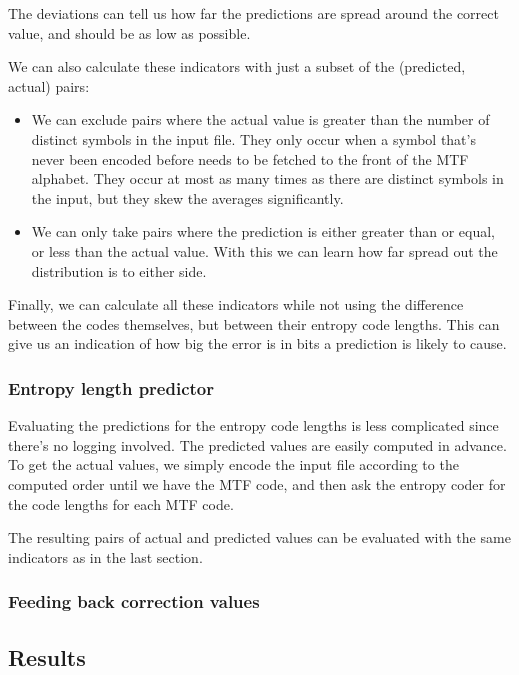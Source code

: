 \documentclass[a4paper]{scrreprt}
\begin{document}
The deviations can tell us how far the predictions are spread around the correct
value, and should be as low as possible.

We can also calculate these indicators with just a subset of the
(predicted, actual) pairs:
\begin{itemize}
  \item We can exclude pairs where the actual value is
  greater than the number of distinct symbols in the input file. They only occur
  when a symbol that's never been encoded before needs to be fetched to the
  front of the MTF alphabet. They occur at most as many times as there are
  distinct symbols in the input, but they skew the averages significantly.
  \item We can only take pairs where the prediction is either greater than or
  equal, or less than the actual value. With this we can learn how far spread
  out the distribution is to either side.
\end{itemize}

Finally, we can calculate all these indicators while not using the difference
between the codes themselves, but between their entropy code lengths. This can
give us an indication of how big the error is in bits a prediction is likely to
cause.

\subsubsection{Entropy length predictor}

Evaluating the predictions for the entropy code lengths is less complicated
since there's no logging involved. The predicted values are easily computed in
advance. To get the actual values, we simply encode the input file according to
the computed order until we have the MTF code, and then ask the entropy coder
for the code lengths for each MTF code.

The resulting pairs of actual and predicted values can be evaluated with the
same indicators as in the last section.


\subsubsection{Feeding back correction values}

\subsection{Results}
\end{document}
